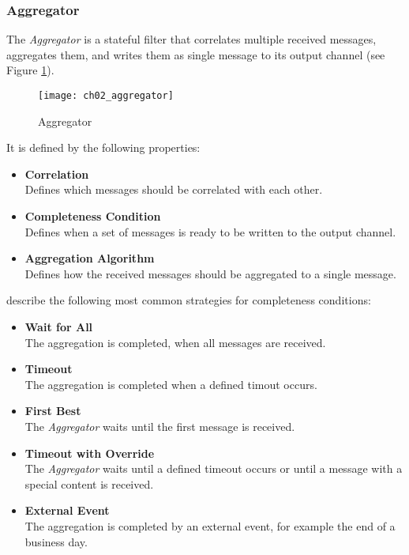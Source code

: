 \subsubsection{Aggregator}
The \emph{Aggregator} is a stateful filter that correlates multiple received messages, aggregates them, and writes them as single message to its output channel (see Figure \ref{fig:ch02_aggregator}).

\begin{figure}[htbp]
	\centering
	\texttt{[image: ch02\_aggregator]}
	\caption{Aggregator \citep{Hohpe:2003fk}}
	\label{fig:ch02_aggregator}
\end{figure}

It is defined by the following properties:
\begin{itemize}
	\item \textbf{Correlation}\\
	Defines which messages should be correlated with each other.
	\item \textbf{Completeness Condition}\\
	Defines when a set of messages is ready to be written to the output channel.
	\item \textbf{Aggregation Algorithm}\\
	Defines how the received messages should be aggregated to a single message.
\end{itemize}

\cite{Hohpe:2003fk} describe the following most common strategies for completeness conditions:
\begin{itemize}
	\item \textbf{Wait for All}\\
	The aggregation is completed, when all messages are received. 
	\item \textbf{Timeout}\\
	The aggregation is completed when a defined timout occurs.
	\item \textbf{First Best}\\
	The \emph{Aggregator} waits until the first message is received.
	\item \textbf{Timeout with Override}\\
	The \emph{Aggregator} waits until a defined timeout occurs or until a message with a special content is received.
	\item \textbf{External Event}\\
	The aggregation is completed by an external event, for example the end of a business day.
\end{itemize}

